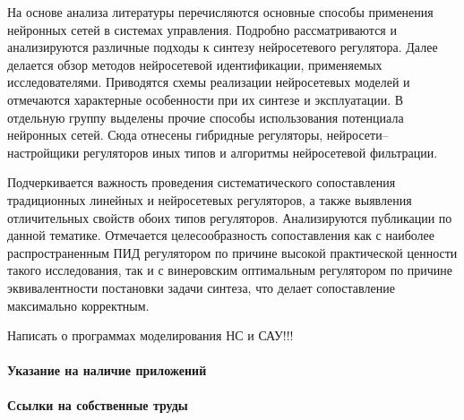 На основе анализа литературы перечисляются основные способы применения
нейронных сетей в системах управления.  Подробно рассматриваются и
анализируются различные подходы к синтезу нейросетевого регулятора.
Далее делается обзор методов нейросетевой идентификации, применяемых
исследователями.  Приводятся схемы реализации нейросетевых моделей и
отмечаются характерные особенности при их синтезе и эксплуатации.  В
отдельную группу выделены прочие способы использования потенциала
нейронных сетей.  Сюда отнесены гибридные регуляторы,
нейросети--настройщики регуляторов иных типов и алгоритмы нейросетевой
фильтрации.

Подчеркивается важность проведения систематического сопоставления
традиционных линейных и нейросетевых регуляторов, а также выявления
отличительных свойств обоих типов регуляторов.  Анализируются
публикации по данной тематике.  Отмечается целесообразность
сопоставления как с наиболее распространенным ПИД регулятором по
причине высокой практической ценности такого исследования, так и с
винеровским оптимальным регулятором по причине эквивалентности
постановки задачи синтеза, что делает сопоставление максимально
корректным.

{\LARGE Написать о программах моделирования НС и САУ!!!}


\paragraph{Указание на наличие приложений}

\paragraph{Ссылки на собственные труды}
